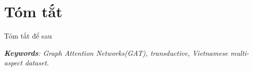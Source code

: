 \chapter*{Tóm tắt}

Tóm tắt để sau 

\vspace{8pt}
\noindent \textit{\textbf{Keywords}: Graph Attention Networks(GAT), transductive, Vietnamese multi-aspect dataset.}

